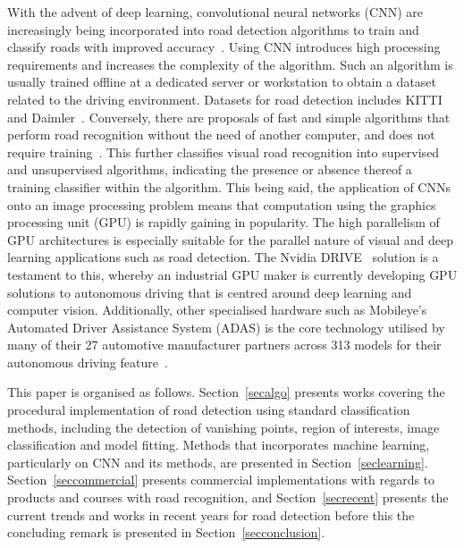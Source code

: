 With the advent of deep learning, convolutional neural networks (CNN) are increasingly being incorporated into road detection algorithms to train and classify roads with improved accuracy~\cite{brust_convolutional_2015,p._y._shinzato_fast_2012,abbas_novel_2016}. Using CNN introduces high processing requirements and increases the complexity of the algorithm. Such an algorithm is usually trained offline at a dedicated server or workstation to obtain a dataset related to the driving environment. Datasets for road detection includes KITTI~\cite{geiger_vision_2013} and Daimler~\cite{scharwachter_efficient_2013}. Conversely, there are proposals of fast and simple algorithms that perform road recognition without the need of another computer, and does not require training~\cite{f._janda_road_2013,cristoforis_real-time_2016}. This further classifies visual road recognition into supervised and unsupervised algorithms, indicating the presence or absence thereof a training classifier within the algorithm. This being said, the application of CNNs onto an image processing problem means that computation using the graphics processing unit (GPU) is rapidly gaining in popularity. The high parallelism of GPU architectures is especially suitable for the parallel nature of visual and deep learning applications such as road detection. The Nvidia DRIVE~\cite{nvidia_corporation_nvidia_2017-1} solution is a testament to this, whereby an industrial GPU maker is currently developing GPU solutions to autonomous driving that is centred around deep learning and computer vision. Additionally, other specialised hardware such as Mobileye's Automated Driver Assistance System (ADAS) is the core technology utilised by many of their 27 automotive manufacturer partners across 313 models for their autonomous driving feature~\cite{mobileye_mobileye_2016}.



This paper is organised as follows. Section~\ref{secalgo} presents works covering the procedural implementation of road detection using standard classification methods, including the detection of vanishing points, region of interests, image classification and model fitting. Methods that incorporates machine learning, particularly on CNN and its methods, are presented in Section~\ref{seclearning}. Section~\ref{seccommercial} presents commercial implementations with regards to products and courses with road recognition, and Section~\ref{secrecent} presents the current trends and works in recent years for road detection before this the concluding remark is presented in Section~\ref{secconclusion}.  


